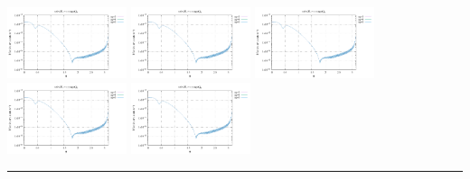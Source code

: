 \noindent
\includegraphics[width=3.5cm]{python_codes/fieldstone_152/RESULTS/exp3/sr2_64_m2}
\includegraphics[width=3.5cm]{python_codes/fieldstone_152/RESULTS/exp3/sr2_64_m3}
\includegraphics[width=3.5cm]{python_codes/fieldstone_152/RESULTS/exp3/sr2_64_m4}
\includegraphics[width=3.5cm]{python_codes/fieldstone_152/RESULTS/exp3/sr2_64_m5}
\includegraphics[width=3.5cm]{python_codes/fieldstone_152/RESULTS/exp3/sr2_64_m6}

\hrule

